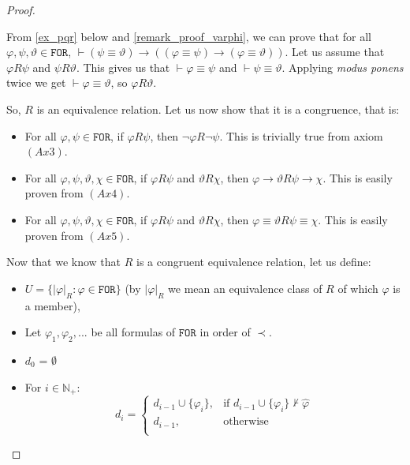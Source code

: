 \documentclass{article}
\theoremstyle{definition}
\theoremstyle{definition}
\theoremstyle{definition}
\newcommand*{\id}{\equiv}
\newcommand*{\ra}{\rightarrow}
\newcommand*{\FOR}{\texttt{FOR}}
\newcommand{\N}{\mathbb{N}}
\begin{document}
\begin{proof}
\begin{itemize}[]
              From \cref{ex_pqr} below and \cref{remark_proof_varphi}, we can prove that for
              all $\varphi, \psi, \vartheta \in \FOR$, $\vdash (\psi \id \vartheta) \ra
                  ((\varphi \id \psi) \ra (\varphi \id \vartheta))$. Let us assume that $\varphi
                  R \psi$ and $\psi R \vartheta$. This gives us that $\vdash \varphi \id \psi$
              and $\vdash \psi \id \vartheta$. Applying \emph{modus ponens} twice we get
              $\vdash \varphi \id \vartheta$, so $\varphi R \vartheta$.
    \end{itemize}
    So, $R$ is an equivalence relation. Let us now show that it is a congruence,
    that is:
    \begin{itemize}[]
        \item For all $\varphi, \psi \in \FOR$, if $\varphi R \psi$, then $\lnot \varphi R
                  \lnot \psi$. This is trivially true from axiom $(Ax3)$.
        \item For all $\varphi, \psi, \vartheta, \chi \in \FOR$, if $\varphi R \psi$ and
              $\vartheta R \chi$, then $\varphi \ra \vartheta R \psi \ra \chi$. This is
              easily proven from $(Ax4)$.
        \item For all $\varphi, \psi, \vartheta, \chi \in \FOR$, if $\varphi R \psi$ and
              $\vartheta R \chi$, then $\varphi \id \vartheta R \psi \id \chi$. This is
              easily proven from $(Ax5)$.
    \end{itemize}
    Now that we know that $R$ is a congruent equivalence relation, let us define:
    \begin{itemize}
        \item $U = \{ |\varphi|_R : \varphi \in \FOR \}$ (by $|\varphi|_R$ we mean an equivalence class of $R$ of which $\varphi$ is a member),
        \item Let $\varphi_1, \varphi_2, ...$ be all formulas of $\FOR$ in order of $\prec$.
        \item $d_0$ = $\emptyset$
        \item For $i \in \N_+$: $$ d_{i} = \begin{cases}
                      d_{i-1} \cup \{\varphi_i\}, & \text{if } d_{i-1} \cup \{\varphi_i\} \not \vdash \hat{\varphi} \\
                      d_{i-1},                    & \text{otherwise}                                                \\
                  \end{cases}
              $$

\end{itemize}
\end{proof}
\end{document}
